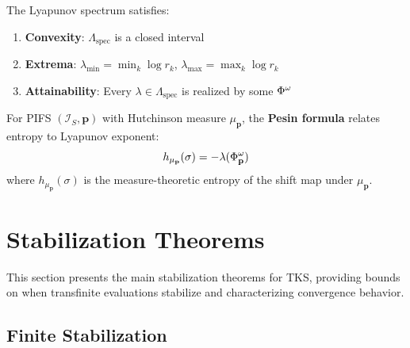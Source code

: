 \begin{proposition}
\label{prop:spectrum-properties}
The Lyapunov spectrum satisfies:
\begin{enumerate}[label=(\roman*)]
  \item \textbf{Convexity}: $\Lambda_{\mathrm{spec}}$ is a closed interval
  \item \textbf{Extrema}: $\lambda_{\min} = \min_k \log r_k$, $\lambda_{\max} = \max_k \log r_k$
  \item \textbf{Attainability}: Every $\lambda \in \Lambda_{\mathrm{spec}}$ is realized by some $\Phi^{\omega}$
\end{enumerate}
\end{proposition}

\begin{definition}
\label{def:entropy-lyapunov}
For PIFS $(\mathcal{I}_S, \mathbf{p})$ with Hutchinson measure $\mu_\mathbf{p}$, the \textbf{Pesin formula} relates entropy to Lyapunov exponent:
\[
h_{\mu_\mathbf{p}}(\sigma) = -\lambda(\Phi^{\omega}_\mathbf{p})
\]
where $h_{\mu_\mathbf{p}}(\sigma)$ is the measure-theoretic entropy of the shift map under $\mu_\mathbf{p}$.
\end{definition}

\section{Stabilization Theorems}
\label{sec:stabilization-theorems}

\begin{tcolorbox}[colback=blue!5!white,colframe=blue!75!black,title=\vnewthree]
This section presents the main stabilization theorems for TKS, providing bounds on when transfinite evaluations stabilize and characterizing convergence behavior.
\end{tcolorbox}

\subsection{Finite Stabilization}

